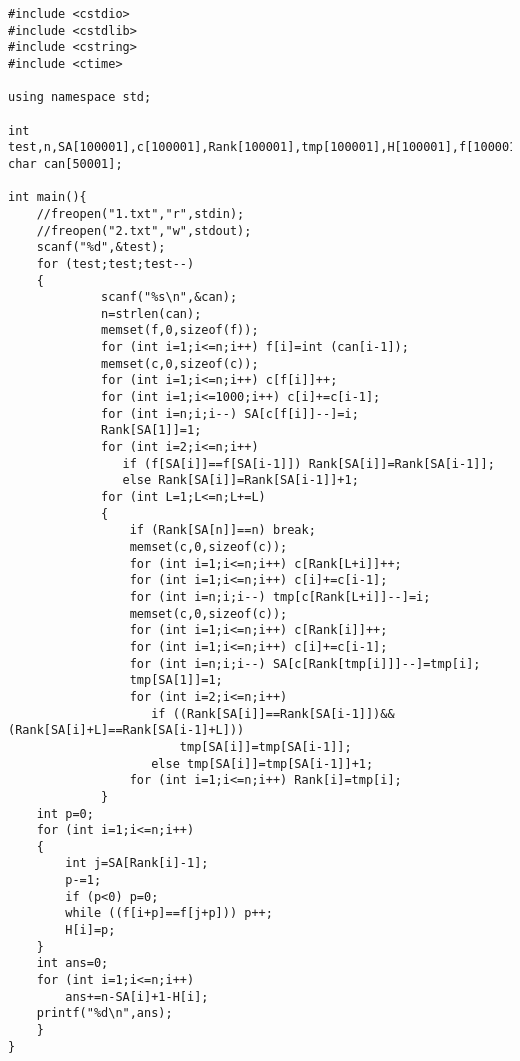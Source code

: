 \begin{lstlisting}
#include <cstdio>
#include <cstdlib>
#include <cstring>
#include <ctime>

using namespace std;

int test,n,SA[100001],c[100001],Rank[100001],tmp[100001],H[100001],f[100001];
char can[50001];

int main(){
    //freopen("1.txt","r",stdin);
    //freopen("2.txt","w",stdout);
    scanf("%d",&test);                              
    for (test;test;test--)
    {
             scanf("%s\n",&can);
             n=strlen(can);
             memset(f,0,sizeof(f));
             for (int i=1;i<=n;i++) f[i]=int (can[i-1]);
             memset(c,0,sizeof(c));
             for (int i=1;i<=n;i++) c[f[i]]++;
             for (int i=1;i<=1000;i++) c[i]+=c[i-1];
             for (int i=n;i;i--) SA[c[f[i]]--]=i;
             Rank[SA[1]]=1;
             for (int i=2;i<=n;i++) 
                if (f[SA[i]]==f[SA[i-1]]) Rank[SA[i]]=Rank[SA[i-1]];
                else Rank[SA[i]]=Rank[SA[i-1]]+1;
             for (int L=1;L<=n;L+=L)
             {
                 if (Rank[SA[n]]==n) break;
                 memset(c,0,sizeof(c));
                 for (int i=1;i<=n;i++) c[Rank[L+i]]++;
                 for (int i=1;i<=n;i++) c[i]+=c[i-1];
                 for (int i=n;i;i--) tmp[c[Rank[L+i]]--]=i;
                 memset(c,0,sizeof(c));
                 for (int i=1;i<=n;i++) c[Rank[i]]++;
                 for (int i=1;i<=n;i++) c[i]+=c[i-1];
                 for (int i=n;i;i--) SA[c[Rank[tmp[i]]]--]=tmp[i];
                 tmp[SA[1]]=1;
                 for (int i=2;i<=n;i++)
                    if ((Rank[SA[i]]==Rank[SA[i-1]])&&(Rank[SA[i]+L]==Rank[SA[i-1]+L]))
                        tmp[SA[i]]=tmp[SA[i-1]];
                    else tmp[SA[i]]=tmp[SA[i-1]]+1;
                 for (int i=1;i<=n;i++) Rank[i]=tmp[i];
             }
    int p=0;
    for (int i=1;i<=n;i++)
    {
        int j=SA[Rank[i]-1];
        p-=1;
        if (p<0) p=0;
        while ((f[i+p]==f[j+p])) p++;
        H[i]=p;
    }
    int ans=0;
    for (int i=1;i<=n;i++)
        ans+=n-SA[i]+1-H[i];
    printf("%d\n",ans);
    }
}
\end{lstlisting}
